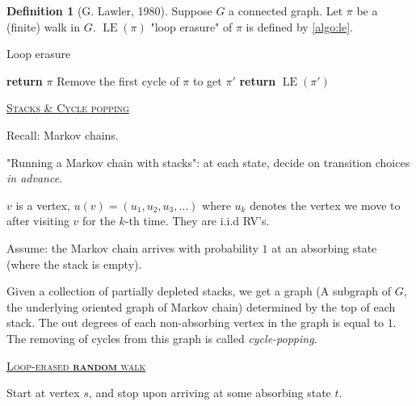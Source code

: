 \documentclass{report}
\def \LE {\operatorname{LE}}
\newcommand{\defeq}{\vcentcolon=}
\newcommand{\fancyem}[1]{\underline{\textsc{#1}}}
\theoremstyle{definition}
\newtheorem{definition}{Definition}[section]
\theoremstyle{remark}
\numberwithin{equation}{section}
\begin{document}
\begin{definition}[G. Lawler, 1980]
    Suppose $G$ a connected graph. Let $\pi$ be a (finite) walk in $G$. $\operatorname{LE}(\pi)$ "loop erasure" of $\pi$ is defined by \autoref{algo:le}.

    \begin{algorithm}[h]
        \caption{Loop erasure}
        \label{algo:le}
        \begin{algorithmic}[1] 
                \State \textbf{return} $\pi$
                \Else 
                    \State Remove the first cycle of $\pi$ to get $\pi'$
                    \State \textbf{return} $\LE(\pi')$
                \EndIf
            \EndFunction
        \end{algorithmic}
    \end{algorithm}

\end{definition}

\fancyem{Stacks \& Cycle popping}

Recall: Markov chains.

"Running a Markov chain with stacks": at each state, decide on transition choices \emph{in advance}.

$v$ is a vertex, $u(v) = (u_1, u_2, u_3, \ldots)$ where $u_k$ denotes the vertex we move to after visiting $v$ for the $k$-th time. They are i.i.d RV's.

Assume: the Markov chain arrives with probability $1$ at an absorbing state (where the stack is empty).

Given a collection of partially depleted stacks, we get a graph (A subgraph of $G$, the underlying oriented graph of Markov chain) determined by the top of each stack.  The out degrees of each non-absorbing vertex in the graph is equal to $1$. The removing of cycles from this graph is called \emph{cycle-popping}.

\fancyem{Loop-erased \textbf{random} walk}

Start at vertex $s$, and stop upon arriving at some absorbing state $t$. 
\end{document}
